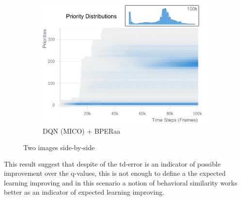 \begin{figure}[h]
\begin{subfigure}{0.32\textwidth}
        \includegraphics[width=\linewidth]{Results/grid_world/priority_distribution_dqn_mico_bperaa.png}
        \caption{DQN (MICO) + BPERaa}
        \label{fig:priority_distribution_bperaa}
    \end{subfigure}
    \caption{Two images side-by-side}
    \label{fig:priority_distributions}
\end{figure}

This result suggest that despite of the td-error is an indicator of possible improvement over the q-values, this is not enough to define a the expected learning improving and in this scenario a notion of behavioral similarity works better as an indicator of expected learning improving.

